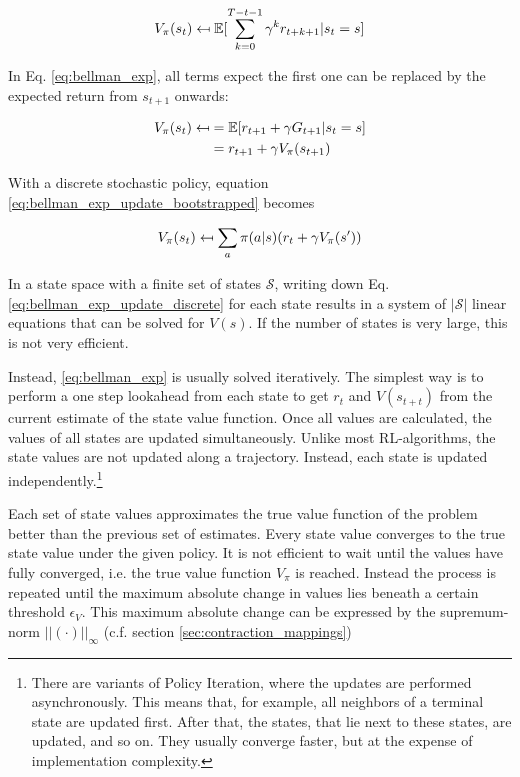 \begin{equation}
V_\pi(s_t) \mathrel{\reflectbox{\ensuremath{\mapsto}}} \mathbb{E}[ \sum_{k=0}^{T-t-1}\gamma^k r_{t+k+1}|s_t=s]
\label{eq:bellman_exp_update}
\end{equation}

In Eq. \ref{eq:bellman_exp}, all terms expect the first one can be replaced by the expected return from $s_{t+1}$ onwards:

\begin{align}
V_\pi(s_t) \mathrel{\reflectbox{\ensuremath{\mapsto}}} 
&=\mathbb{E}[r_{t+1}+\gamma G_{t+1}|s_t=s]\\
&=r_{t+1}+\gamma V_\pi(s_{t+1})
\label{eq:bellman_exp_update_bootstrapped}
\end{align}

With a discrete stochastic policy, equation \ref{eq:bellman_exp_update_bootstrapped} becomes


\begin{equation}
V_{\pi}(s_t) \mathrel{\reflectbox{\ensuremath{\mapsto}}} \sum_{a}\pi(a|s)(r_t+\gamma V_\pi(s'))
\label{eq:bellman_exp_update_discrete}
\end{equation}

In a state space with a finite set of states $\mathcal{S}$, writing down Eq. \ref{eq:bellman_exp_update_discrete} for each state results in a system of $|\mathcal{S}|$ linear equations that can be solved for $V(s)$. If the number of states is very large, this is not very efficient. 

Instead, \ref{eq:bellman_exp} is usually solved iteratively. The simplest way is to perform a one step lookahead from each state to get $r_t$ and $V(s_{t+t})$ from the current estimate of the state value function. Once all values are calculated, the values of all states are updated simultaneously. Unlike most RL-algorithms, the state values are not updated along a trajectory. Instead, each state is updated independently.\footnote{There are variants of Policy Iteration, where the updates are performed asynchronously. This means that, for example, all neighbors of a terminal state are updated first. After that, the states, that lie next to these states, are updated, and so on. They usually converge faster, but at the expense of implementation complexity.}

Each set of state values approximates the true value function of the problem better than the previous set of estimates. Every state value converges to the true state value under the given policy. It is not efficient to wait until the values have fully converged, i.e. the true value function $V_\pi$ is reached. Instead the process is repeated until the maximum absolute change in values lies beneath a certain threshold $\epsilon_V$. This maximum absolute change can be expressed by the supremum-norm $||(\cdot)||_\infty$ (c.f. section \ref{sec:contraction_mappings})

